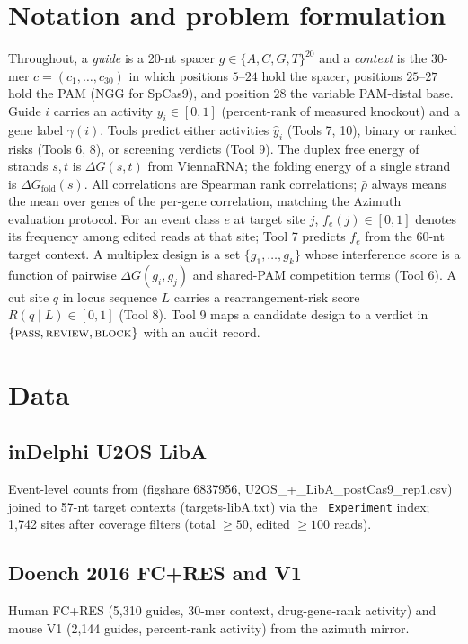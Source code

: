 \documentclass[12pt]{article}
\begin{document}
\section{Notation and problem formulation}
Throughout, a \emph{guide} is a 20-nt spacer $g \in \{A,C,G,T\}^{20}$ and a
\emph{context} is the 30-mer $c = (c_1,\dots,c_{30})$ in which positions
$5$--$24$ hold the spacer, positions $25$--$27$ hold the PAM (NGG for
SpCas9), and position $28$ the variable PAM-distal base. Guide $i$ carries an
activity $y_i \in [0,1]$ (percent-rank of measured knockout) and a gene label
$\gamma(i)$. Tools predict either activities $\hat y_i$ (Tools 7, 10), binary
or ranked risks (Tools 6, 8), or screening verdicts (Tool 9). The duplex free
energy of strands $s,t$ is $\Delta G(s,t)$ from ViennaRNA; the folding energy
of a single strand is $\Delta G_{\mathrm{fold}}(s)$. All correlations are
Spearman rank correlations; $\bar\rho$ always means the mean over genes of
the per-gene correlation, matching the Azimuth evaluation protocol. For an
event class $e$ at target site $j$, $f_e(j) \in [0,1]$ denotes its frequency
among edited reads at that site; Tool 7 predicts $f_e$ from the 60-nt target
context. A multiplex design is a set $\{g_1,\dots,g_k\}$ whose interference
score is a function of pairwise $\Delta G(g_i,g_j)$ and shared-PAM
competition terms (Tool 6). A cut site $q$ in locus sequence $L$ carries a
rearrangement-risk score $R(q \mid L) \in [0,1]$ (Tool 8). Tool 9 maps a
candidate design to a verdict in
$\{\textsc{pass},\textsc{review},\textsc{block}\}$ with an audit record.

\section{Data}
\subsection{inDelphi U2OS LibA}
Event-level counts from \cite{shen2018} (figshare 6837956, U2OS\_+\_LibA\_postCas9\_rep1.csv)
joined to 57-nt target contexts (targets-libA.txt) via the \texttt{\_Experiment} index;
1,742 sites after coverage filters (total $\geq 50$, edited $\geq 100$ reads).
\subsection{Doench 2016 FC+RES and V1}
Human FC+RES (5,310 guides, 30-mer context, drug-gene-rank activity) and mouse V1
(2,144 guides, percent-rank activity) from the azimuth mirror.
\end{document}
